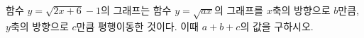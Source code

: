 \hspace*{2mm}\begin{minipage}[t]{\dimexpr\linewidth-2mm\relax}\vspace{0pt}
함수 $y=\sqrt{2x+6}-1$의 그래프는 함수 $y=\sqrt{ax}$의 그래프를 $x$축의 방향으로 $b$만큼, $y$축의 방향으로 $c$만큼 평행이동한 것이다. 이때 $a+b+c$의 값을 구하시오. \end{minipage}
